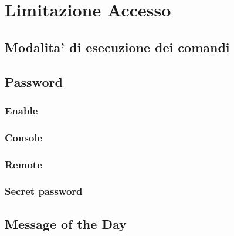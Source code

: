 \section{Limitazione Accesso}
\subsection{Modalita' di esecuzione dei comandi}
\subsection{Password}
\subsubsection{Enable}
\subsubsection{Console}
\subsubsection{Remote}
\subsubsection{Secret password}
\subsection{Message of the Day}
